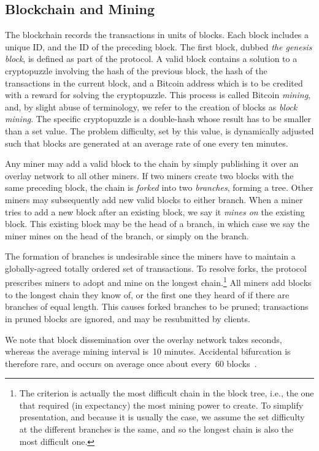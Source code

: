 \documentclass[letterpaper]{llncs}
\newcommand{\negspace}{\vspace{-0.5\baselineskip}}
\begin{document}
        \subsection{Blockchain and Mining} 
\negspace

The blockchain records the transactions in units of blocks. Each block includes a unique ID, and the ID of the preceding block. The first block, dubbed \emph{the genesis block}, is defined as part of the protocol. A valid block contains a solution to a cryptopuzzle involving the hash of the previous block, the hash of the transactions in the current block, and a Bitcoin address which is to be credited with a reward for solving the cryptopuzzle. This process is called Bitcoin \emph{mining}, and, by slight abuse of terminology, we refer to the creation of blocks as \emph{block mining}. 
The specific cryptopuzzle is a double-hash whose result has to be smaller than a set value. The problem difficulty, set by this value, is dynamically adjusted such that blocks are generated at an average rate of one every ten minutes. 

Any miner may add a valid block to the chain by simply publishing it over an overlay network to all other miners. 
If two miners create two blocks with the same preceding block, the chain is \emph{forked} into two \emph{branches}, forming a tree. Other miners may subsequently add new valid blocks to either branch. When a miner tries to add a new block after an existing block, we say it \emph{mines on} the existing block. This existing block may be the head of a branch, in which case we say the miner mines on the head of the branch, or simply on the branch. 

The formation of branches is undesirable since the miners have to maintain a globally-agreed totally ordered set of transactions. To resolve forks, the protocol prescribes miners to adopt and mine on the longest chain.\footnote{The criterion is actually the most difficult chain in the block tree, i.e., the one that required (in expectancy) the most mining power to create. To simplify presentation, and because it is usually the case, we assume the set difficulty at the different branches is the same, and so the longest chain is also the most difficult one.} All miners add blocks to the longest chain they know of, or the first one they heard of if there are branches of equal length. This causes forked branches to be pruned; transactions in pruned blocks are ignored, and may be resubmitted by clients.

We note that block dissemination over the overlay network takes seconds, whereas the average mining interval is~10 minutes. Accidental bifurcation is therefore rare, and occurs on average once about every~60 blocks~\cite{decker2013propagation}. 
\end{document}
